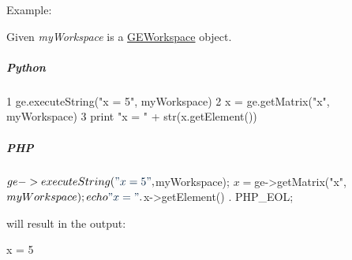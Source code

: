 Example\-:

Given {\itshape my\-Workspace} is a \hyperlink{class_g_e_workspace}{G\-E\-Workspace} object.

\subparagraph*{Python}


\begin{DoxyCode}
1 ge.executeString(\textcolor{stringliteral}{"x = 5"}, myWorkspace)
2 x = ge.getMatrix(\textcolor{stringliteral}{"x"}, myWorkspace)
3 \textcolor{keywordflow}{print} \textcolor{stringliteral}{"x = "} + str(x.getElement())
\end{DoxyCode}


\subparagraph*{P\-H\-P}


\begin{DoxyCode}
$ge->executeString(\textcolor{stringliteral}{"x = 5"}, $myWorkspace);
$x = $ge->getMatrix(\textcolor{stringliteral}{"x"}, $myWorkspace);
echo \textcolor{stringliteral}{"x = "} . $x->getElement() . PHP\_EOL;
\end{DoxyCode}
 will result in the output\-: 
\begin{DoxyCode}
x = 5
\end{DoxyCode}



